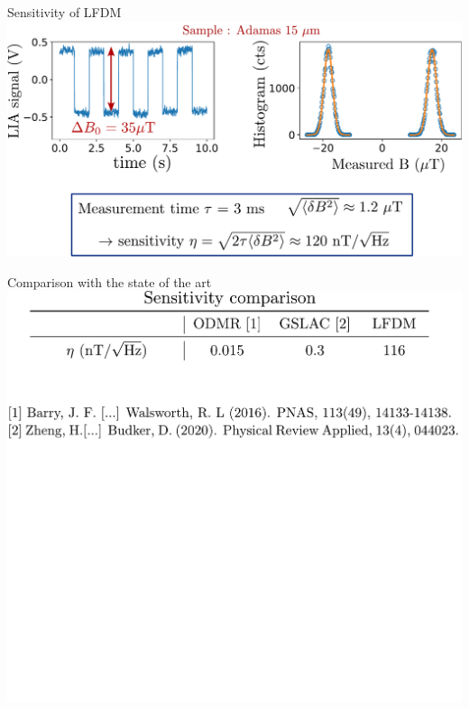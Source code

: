 \documentclass{beamer}
\begin{document}
\begin{frame}{Sensitivity of LFDM}
\centering
\includegraphics[width=\textwidth,height=0.85\textheight,keepaspectratio]{Slide_sensi_LFDM}
\end{frame}

\begin{frame}{Comparison with the state of the art}
\centering
\includegraphics[width=\textwidth,height=0.85\textheight,keepaspectratio]{Slide_comparison_litterature_f-6}
\end{frame}
\end{document}
